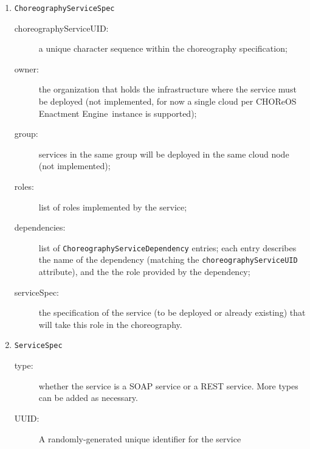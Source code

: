 \documentclass[a4paper, 10pt]{article}
\newcommand{\ee}{CHOReOS Enactment Engine}
\begin{document}
\begin{enumerate}

\item \verb!ChoreographyServiceSpec! 
	\begin{description}
		\item [choreographyServiceUID:] a unique character sequence within the choreography specification;
		\item [owner:] the organization that holds the infrastructure where the service must be deployed (not implemented, for now a single cloud per \ee\ instance is supported);
		\item [group:] services in the same group will be deployed in the same cloud node (not implemented);
		\item [roles:] list of roles implemented by the service;
		\item [dependencies:] list of \verb!ChoreographyServiceDependency! entries; each entry describes the name of the dependency (matching the \verb!choreographyServiceUID! attribute), and the the role provided by the dependency;
		\item [serviceSpec:] the specification of the service (to be deployed or already existing) that will take this role in the choreography.
	\end{description}

\item \verb!ServiceSpec!
	\begin{description}
		\item [type:] whether the service is a SOAP service or a REST service. More types can be added as necessary.
		\item [UUID:] A randomly-generated unique identifier for the service
	\end{description}


\end{enumerate}
\end{document}
